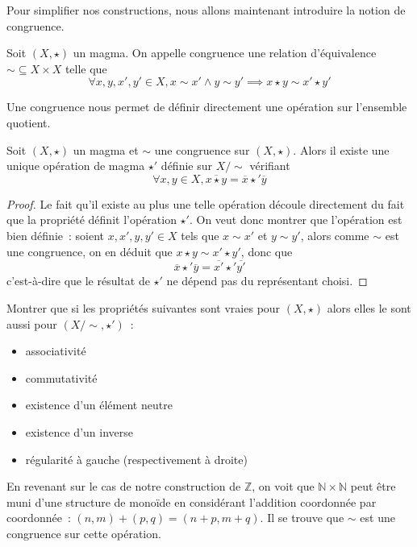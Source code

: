 Pour simplifier nos constructions, nous allons maintenant introduire la notion
de congruence.

\begin{definition}[Congruence]
  Soit $(X,\star)$ un magma. On appelle congruence une relation d'équivalence
  $\sim\subseteq X \times X$ telle que
  \[\forall x,y,x',y' \in X, x\sim x' \land y \sim y'
  \implies x\star y \sim x' \star y'\]
\end{definition}

Une congruence nous permet de définir directement une opération sur l'ensemble
quotient.

\begin{proposition}
  Soit $(X,\star)$ un magma et $\sim$ une congruence sur $(X,\star)$. Alors
  il existe une unique opération de magma $\star'$ définie sur $X/\sim$
  vérifiant
  \[\forall x,y \in X, \overline{x\star y} = \overline x\star' \overline y\]
\end{proposition}

\begin{proof}
  Le fait qu'il existe au plus une telle opération découle directement du fait
  que la propriété définit l'opération $\star'$. On veut donc montrer que
  l'opération est bien définie~: soient $x,x',y,y'\in X$ tels que
  $x\sim x'$ et $y\sim y'$, alors comme $\sim$ est une congruence, on en
  déduit que $x\star y \sim x' \star y'$, donc que
  \[\overline x \star' \overline y = \overline{x'}\star' \overline{y'}\]
  c'est-à-dire que le résultat de $\star'$ ne dépend pas du représentant choisi.
\end{proof}

\begin{exercise}
  Montrer que si les propriétés suivantes sont vraies pour $(X,\star)$ alors
  elles le sont aussi pour $(X/\sim,\star')$~:
  \begin{itemize}
  \item associativité
  \item commutativité
  \item existence d'un élément neutre
  \item existence d'un inverse
  \item régularité à gauche (respectivement à droite)
  \end{itemize}
\end{exercise}

En revenant sur le cas de notre construction de $\mathbb Z$, on voit que
$\mathbb N\times\mathbb N$ peut être muni d'une structure de monoïde en
considérant l'addition coordonnée par coordonnée~: $(n,m)+(p,q) = (n+p,m+q)$.
Il se trouve que $\sim$ est une congruence sur cette opération.

